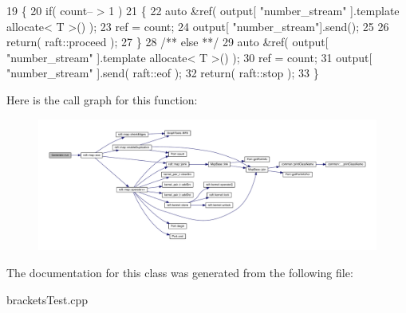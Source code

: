 \begin{DoxyCode}
19    \{
20       \textcolor{keywordflow}{if}( count-- > 1 )
21       \{
22          \textcolor{keyword}{auto} &ref( output[ \textcolor{stringliteral}{"number\_stream"} ].\textcolor{keyword}{template} allocate< T >() );
23          ref = count;
24          output[ \textcolor{stringliteral}{"number\_stream"}].send();
25          
26          \textcolor{keywordflow}{return}( raft::proceed );
27       \}\textcolor{comment}{}
28 \textcolor{comment}{      /** else **/}
29       \textcolor{keyword}{auto} &ref( output[ \textcolor{stringliteral}{"number\_stream"} ].\textcolor{keyword}{template} allocate< T >() );
30       ref = count;
31       output[ \textcolor{stringliteral}{"number\_stream"} ].send( raft::eof );
32       \textcolor{keywordflow}{return}( raft::stop );
33    \}
\end{DoxyCode}
Here is the call graph for this function\+:
\nopagebreak
\begin{figure}[H]
\begin{center}
\leavevmode
\includegraphics[width=350pt]{class_generate_aa8253370207e1457b9b79e62253c2925_cgraph}
\end{center}
\end{figure}


The documentation for this class was generated from the following file\+:\begin{DoxyCompactItemize}
\item 
brackets\+Test.\+cpp\end{DoxyCompactItemize}
